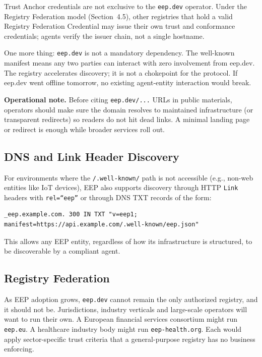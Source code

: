 \documentclass[12pt,a4paper]{article}
\begin{document}
Trust Anchor credentials are not exclusive to the \texttt{eep.dev} operator. Under the Registry Federation model (Section~4.5), other registries that hold a valid Registry Federation Credential may issue their own trust and conformance credentials; agents verify the issuer chain, not a single hostname.

One more thing: \texttt{eep.dev} is not a mandatory dependency. The well-known manifest means any two parties can interact with zero involvement from eep.dev. The registry accelerates discovery; it is not a chokepoint for the protocol. If eep.dev went offline tomorrow, no existing agent-entity interaction would break.

\textbf{Operational note.} Before citing \texttt{eep.dev/...} URLs in public materials, operators should make sure the domain resolves to maintained infrastructure (or transparent redirects) so readers do not hit dead links. A minimal landing page or redirect is enough while broader services roll out.

\subsection{DNS and Link Header Discovery}

For environments where the \texttt{/.well-known/} path is not accessible (e.g., non-web entities like IoT devices), EEP also supports discovery through HTTP \texttt{Link} headers with \texttt{rel=``eep''} or through DNS TXT records of the form:

\begin{lstlisting}[language=EEPJson,style=eepcode]
_eep.example.com. 300 IN TXT "v=eep1; manifest=https://api.example.com/.well-known/eep.json"
\end{lstlisting}

This allows any EEP entity, regardless of how its infrastructure is structured, to be discoverable by a compliant agent.

\subsection{Registry Federation}

As EEP adoption grows, \texttt{eep.dev} cannot remain the only authorized registry, and it should not be. Jurisdictions, industry verticals and large-scale operators will want to run their own. A European financial services consortium might run \texttt{eep.eu}. A healthcare industry body might run \texttt{eep-health.org}. Each would apply sector-specific trust criteria that a general-purpose registry has no business enforcing.
\end{document}
